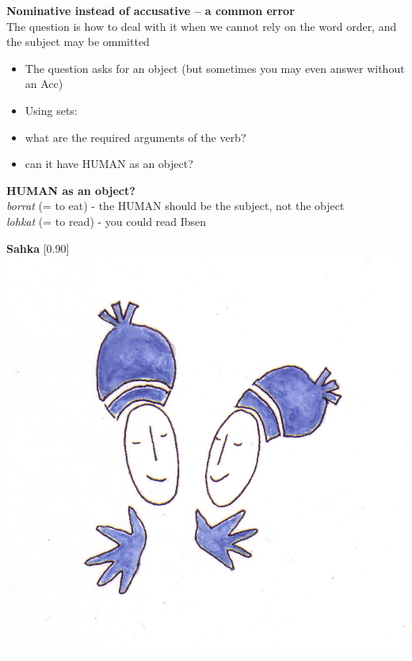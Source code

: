 \documentclass[landscape,norsk,11pt]{seminar}
\begin{document}
\begin{slide}
\newslide
\textbf{Nominative instead of accusative -- a common error} \\
The question is how to deal with it when we cannot rely on the word order, and the subject may be ommitted
\begin{itemize}
\item The question asks for an object (but sometimes you may even answer without an Acc)
\item Using sets:
\item what are the required arguments of the verb?
\item can it have HUMAN as an object? 
\end{itemize}

\newslide
\textbf{HUMAN as an object?} \\
 \textit{borrat} (= to eat) - the HUMAN should be the subject, not the object \\
  \textit{lohkat} (= to read) - you could read Ibsen

\newslide
\textbf{Sahka}
\scalebox{0.90}[0.90]{\includegraphics{img/sahka.png}} \\


\end{slide}
\end{document}
